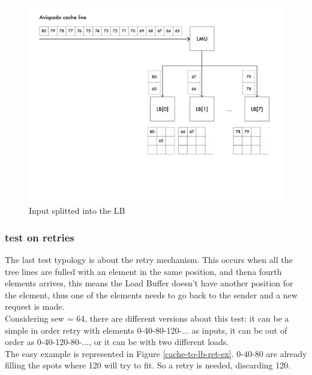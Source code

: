 \begin{figure}[H]
    \centering
    \includegraphics[scale = 0.6]{Chapter_2/img/cache-to-lb-split-ex.png}
    \caption{Input splitted into the LB}
    \label{cache-to-lb-split-ex}
\end{figure}

\subsubsection{test on retries}
The last test typology is about the retry mechanism. This occurs when all the tree lines are fulled with an element in the same position, and thena fourth elements arrives, this means the Load Buffer doesn't have another position for the element, thus one of the elements needs to go back to the sender and a new request is made.\\

Considering sew = 64, there are different versions about this test: it can be a simple in order retry with elements 0-40-80-120-... as inputs, it can be out of order as 0-40-120-80-..., or it can be with two different loads.\\

The easy example is represented in Figure \ref{cache-to-lb-ret-ex}. 0-40-80 are already filling the spots where 120 will try to fit. So a retry is needed, discarding 120.

